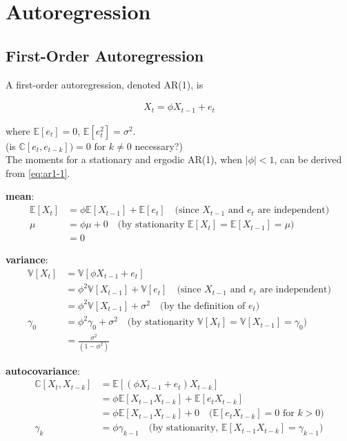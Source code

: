 \documentclass[latex/main.tex]{subfiles}
\begin{document}
\section{Autoregression}

\subsection{First-Order Autoregression}

A first-order autoregression, denoted AR(1), is

\begin{align}
    X_t = \phi X_{t-1} + e_t \label{eq:ar1-1}
\end{align}

where $\mathbb{E}[e_t] = 0$, $\mathbb{E}[e_t^2] = \sigma^2$.\\
(is $\mathbb{C}[e_t, e_{t-k}]) = 0\text{ for }k\ne0$ necessary?)\\

The moments for a stationary and ergodic AR(1), when $|\phi| < 1$, can be derived from \eqref{eq:ar1-1}.


\textbf{mean}:
\begin{align*}
    \mathbb{E}[X_t] &= \phi \mathbb{E}[X_{t-1}] + \mathbb{E}[e_t] \quad\text{(since $X_{t-1}$ and $e_t$ are independent)}\\
    \mu &= \phi \mu + 0 \quad\text{(by stationarity $\mathbb{E}[X_t] = \mathbb{E}[X_{t-1}] = \mu$)}\\
    &= 0
\end{align*}


\textbf{variance}:
\begin{align*}
    \mathbb{V}[X_t] &= \mathbb{V}[\phi X_{t-1} + e_t]\\
    &= \phi^2 \mathbb{V}[X_{t-1}] + \mathbb{V}[e_t] \quad \text{(since $X_{t-1}$ and $e_t$ are independent)}\\
    &= \phi^2 \mathbb{V}[X_{t-1}] + \sigma^2 \quad \text{(by the definition of $e_t$)}\\
    \gamma_0 &= \phi^2 \gamma_0 + \sigma^2 \quad \text{(by stationarity $\mathbb{V}[X_t] = \mathbb{V}[X_{t-1}] = \gamma_0$)}\\
    &= \frac{\sigma^2}{(1 - \phi^2)}
\end{align*}


\textbf{autocovariance}:
\begin{align*}
    \mathbb{C}[X_t,X_{t-k}] &= \mathbb{E}[(\phi X_{t-1} + e_t) X_{t-k}]\\
    &= \phi \mathbb{E}[X_{t-1}X_{t-k}] + \mathbb{E}[e_t X_{t-k}]\\
    &= \phi \mathbb{E}[X_{t-1} X_{t-k}] + 0 \quad \text{($\mathbb{E}[e_t X_{t-k}] = 0$ for $k>0$)}\\
    \gamma_k &= \phi \gamma_{k-1} \quad \text{(by stationarity, $\mathbb{E}[X_{t-1}X_{t-k}] = \gamma_{k-1}$)}
\end{align*}
\end{document}

